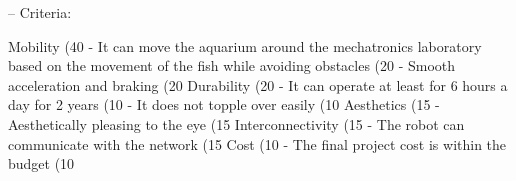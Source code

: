 \documentclass[a4paper, 10pt, DIV=16, parskip = full, twocolumn = true]{scrartcl}
\begin{document}
-- Criteria:

Mobility (40%
- It can move the aquarium around the mechatronics laboratory based on the movement of the fish while avoiding obstacles (20%
- Smooth acceleration and braking (20%
Durability  (20%
- It can operate at least for 6 hours a day for 2 years (10%
- It does not topple over easily (10%
Aesthetics (15%
- Aesthetically pleasing to the eye (15%
Interconnectivity (15%
- The robot can communicate with the network (15%
Cost (10%
- The final project cost is within the budget (10%


\end{document}

